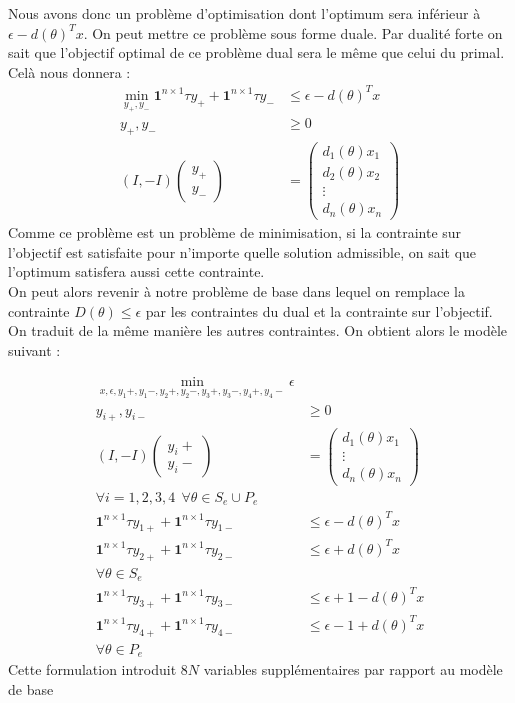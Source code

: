 Nous avons donc un problème d'optimisation dont l'optimum sera inférieur à $\epsilon- d(\theta)^T x $. On peut mettre ce problème sous forme duale. Par dualité forte on sait que l'objectif optimal de ce problème dual sera le même que celui du primal. Celà nous donnera :
\begin{align*}
\min_{y_+,y_-} \mathbf{1}^{n\times 1}\tau y_++\mathbf{1}^{n\times 1}\tau y_- & \leq \epsilon- d(\theta)^T x \\
y_+,y_-  & \geq  0 \\
(I,-I)\begin{pmatrix}
y_+ \\
y_-
\end{pmatrix}
& = 
\begin{pmatrix}
d_1(\theta)x_1 \\
d_2(\theta)x_2 \\
\vdots \\
d_n(\theta)x_n 
\end{pmatrix}
\end{align*}
Comme ce problème est un problème de minimisation, si la contrainte sur l'objectif est satisfaite pour n'importe quelle solution admissible, on sait que l'optimum satisfera aussi cette contrainte.\\
On peut alors revenir à notre problème de base dans lequel on remplace la contrainte $D(\theta)\leq \epsilon$ par les contraintes du dual et la contrainte sur l'objectif.
On traduit de la même manière les autres contraintes. On obtient alors le modèle suivant :

\begin{align*}
\min_{x,\epsilon ,y_1+,y_1-,y_2+,y_2-,y_3+,y_3-,y_4+,y_4-} \epsilon &  \\
y_{i+},y_{i-}  & \geq  0 \\
(I,-I)
 \begin{pmatrix}
y_i+ \\
y_i-
\end{pmatrix}
& = 
\begin{pmatrix}
d_1(\theta)x_1 \\
\vdots \\
d_n(\theta)x_n 
\end{pmatrix} \\
\forall i = 1,2,3,4\:\:
\forall \theta \in S_e \cup P_e  &  \\
\mathbf{1}^{n\times 1}\tau y_{1+}+\mathbf{1}^{n\times 1}\tau y_{1-} & \leq \epsilon -d(\theta)^Tx \\
\mathbf{1}^{n\times 1}\tau y_{2+}+\mathbf{1}^{n\times 1}\tau y_{2-} & \leq \epsilon + d(\theta)^Tx \\
\forall \theta \in S_e &  \\
\mathbf{1}^{n\times 1}\tau y_{3+}+\mathbf{1}^{n\times 1}\tau y_{3-} & \leq  \epsilon +1 -d(\theta)^Tx \\
\mathbf{1}^{n\times 1}\tau y_{4+}+\mathbf{1}^{n\times 1}\tau y_{4-} & \leq  \epsilon -1 + d(\theta)^Tx \\
\forall \theta \in P_e & 
\end{align*}
Cette formulation introduit $8N$ variables supplémentaires par rapport au modèle de base
\FloatBarrier
